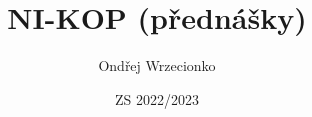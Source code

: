 \documentclass{article}
\title{NI-KOP (přednášky)}
\author{Ondřej Wrzecionko}
\date{ZS 2022/2023}
\begin{document}
\maketitle

\renewcommand{\contentsname}{Obsah}
\tableofcontents

          
\end{document}
